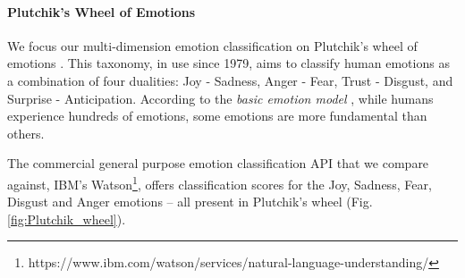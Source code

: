\documentclass[letterpaper]{article} \usepackage{aaai19}  \usepackage{times}  \usepackage{helvet}  \usepackage{courier}  \usepackage{url}  \usepackage{graphicx}  \usepackage{booktabs}
\begin{document}
\begin{table*}[!bp]
\caption{Difficult video game tweets.}
\label{table:video-game-tweets}
\end{table*}
\paragraph{Plutchik's Wheel of Emotions}
We focus our multi-dimension emotion classification on Plutchik's wheel of emotions \protect\cite{Plutchik1979}. This taxonomy, in use since 1979, aims to classify human emotions as a combination of four dualities: Joy - Sadness, Anger - Fear, Trust - Disgust, and Surprise - Anticipation. According to the \textit{basic emotion model} \protect\cite{Ekman2013AnAF}, while humans experience hundreds of emotions, some emotions are more fundamental than others. 

The commercial general purpose emotion classification API that we compare against, IBM's Watson\footnote{https://www.ibm.com/watson/services/natural-language-understanding/}, offers classification scores for the Joy, Sadness, Fear, Disgust and Anger emotions -- all present in Plutchik's wheel (Fig. \ref{fig:Plutchik_wheel}).
\end{document}
